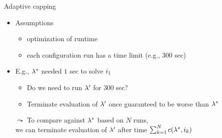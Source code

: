 \begin{frame}[c,fragile]{Adaptive capping }

\begin{itemize}
	\item Assumptions
	\begin{itemize} 
		\item optimization of runtime
		\item each configuration run has a time limit (e.g., $300$ sec)
	\end{itemize}
	\pause    
	
	\item E.g., $\mathbf{\lambda}^*$ needed $1$ sec to solve $i_1$
	\begin{itemize}
		\item Do we need to run $\mathbf{\lambda}'$ for $300$ sec?
		\item Terminate evaluation of $\mathbf{\lambda}'$ once guaranteed to be worse than $\mathbf{\lambda}^*$
	\end{itemize}
	\pause
	\bigskip    
	\item[$\leadsto$] To compare against $\mathbf{\lambda}^*$ based on $N$ runs,\\we can terminate evaluation of $\mathbf{\lambda}'$ after time $\sum_{k=1}^N c(\mathbf{\lambda}^*,i_k)$
\end{itemize}

\end{frame}
